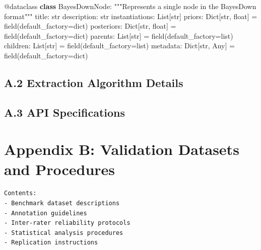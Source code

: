 \documentclass[
  11pt,
  letterpaper,
]{book}
\newenvironment{Shaded}{\begin{snugshade}}{\end{snugshade}}
\newcommand{\AttributeTok}[1]{\textcolor[rgb]{0.40,0.45,0.13}{#1}}
\newcommand{\BuiltInTok}[1]{\textcolor[rgb]{0.00,0.23,0.31}{#1}}
\newcommand{\CommentTok}[1]{\textcolor[rgb]{0.37,0.37,0.37}{#1}}
\newcommand{\KeywordTok}[1]{\textcolor[rgb]{0.00,0.23,0.31}{\textbf{#1}}}
\newcommand{\NormalTok}[1]{\textcolor[rgb]{0.00,0.23,0.31}{#1}}
\newcommand{\OperatorTok}[1]{\textcolor[rgb]{0.37,0.37,0.37}{#1}}
\begin{document}
\begin{Shaded}
\begin{Highlighting}[]
\AttributeTok{@dataclass}
\KeywordTok{class}\NormalTok{ BayesDownNode:}
    \CommentTok{"""Represents a single node in the BayesDown format"""}
\NormalTok{    title: }\BuiltInTok{str}
\NormalTok{    description: }\BuiltInTok{str}
\NormalTok{    instantiations: List[}\BuiltInTok{str}\NormalTok{]}
\NormalTok{    priors: Dict[}\BuiltInTok{str}\NormalTok{, }\BuiltInTok{float}\NormalTok{] }\OperatorTok{=}\NormalTok{ field(default\_factory}\OperatorTok{=}\BuiltInTok{dict}\NormalTok{)}
\NormalTok{    posteriors: Dict[}\BuiltInTok{str}\NormalTok{, }\BuiltInTok{float}\NormalTok{] }\OperatorTok{=}\NormalTok{ field(default\_factory}\OperatorTok{=}\BuiltInTok{dict}\NormalTok{)}
\NormalTok{    parents: List[}\BuiltInTok{str}\NormalTok{] }\OperatorTok{=}\NormalTok{ field(default\_factory}\OperatorTok{=}\BuiltInTok{list}\NormalTok{)}
\NormalTok{    children: List[}\BuiltInTok{str}\NormalTok{] }\OperatorTok{=}\NormalTok{ field(default\_factory}\OperatorTok{=}\BuiltInTok{list}\NormalTok{)}
\NormalTok{    metadata: Dict[}\BuiltInTok{str}\NormalTok{, Any] }\OperatorTok{=}\NormalTok{ field(default\_factory}\OperatorTok{=}\BuiltInTok{dict}\NormalTok{)}
\end{Highlighting}
\end{Shaded}

\subsection*{A.2 Extraction Algorithm
Details}\label{sec-extraction-details}

\subsection*{A.3 API Specifications}\label{sec-api-specs}

\section*{Appendix B: Validation Datasets and
Procedures}\label{sec-appendix-validation}


\begin{verbatim}
Contents:
- Benchmark dataset descriptions
- Annotation guidelines
- Inter-rater reliability protocols
- Statistical analysis procedures
- Replication instructions
\end{verbatim}
\end{document}
